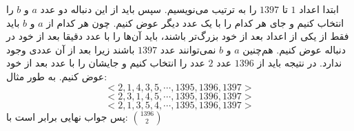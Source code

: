         \p
ابتدا اعداد
$1$
تا
$1397$
را به ترتیب می‌نویسیم. سپس باید از این دنباله دو عدد
$a$
و
$b$
را انتخاب کنیم و جای هر کدام را با یک عدد دیگر عوض کنیم. چون هر کدام از
$a$
و
$b$
باید فقط از یکی از اعداد بعد از خود بزرگ‌تر باشند، باید آن‌ها را با عدد دقیقا بعد از خود در دنباله عوض کنیم. هم‌چنین
$a$
و
$b$
نمی‌توانند عدد
$1397$
باشند زیرا بعد از آن عددی وجود ندارد. در نتیجه باید از
$1396$
عدد
$2$
عدد را انتخاب کنیم و جایشان را با عدد بعد از خود عوض کنیم. به طور مثال:
$$<2, 1, 4, 3, 5, \cdots, 1395, 1396, 1397>$$
$$<2, 3, 1, 4, 5, \cdots, 1395, 1396, 1397>$$
$$<2, 1, 3, 5, 4, \cdots, 1395, 1396, 1397>$$
پس جواب نهایی برابر است با:
$\binom{1396}{2}$